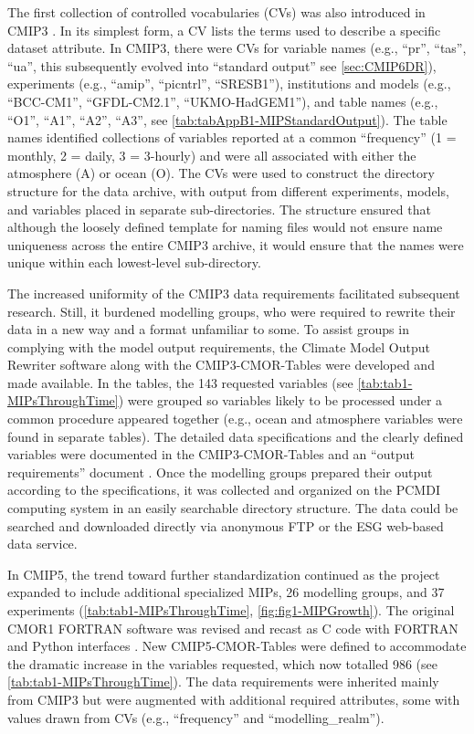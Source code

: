\documentclass[manuscript]{copernicus}
\begin{document}
The first collection of controlled vocabularies (CVs) was also introduced in CMIP3 \citep[e.g.,][]{taylor_pcmdi_2005}. In its simplest form, a CV lists the terms used to describe a specific dataset attribute. In CMIP3, there were CVs for variable names (e.g., ``pr'', ``tas'', ``ua'', this subsequently evolved into ``standard output'' see \autoref{sec:CMIP6DR}), experiments (e.g., ``amip'', ``picntrl'', ``SRESB1''), institutions and models (e.g., ``BCC-CM1'', ``GFDL-CM2.1'', ``UKMO-HadGEM1''), and table names (e.g., ``O1'', ``A1'', ``A2'', ``A3'', see \autoref{tab:tabAppB1-MIPStandardOutput}). The table names identified collections of variables reported at a common ``frequency'' (1 = monthly, 2 = daily, 3 = 3-hourly) and were all associated with either the atmosphere (A) or ocean (O). The CVs were used to construct the directory structure for the data archive, with output from different experiments, models, and variables placed in separate sub-directories. The structure ensured that although the loosely defined template for naming files would not ensure name uniqueness across the entire CMIP3 archive, it would ensure that the names were unique within each lowest-level sub-directory.

The increased uniformity of the CMIP3 data requirements facilitated subsequent research. Still, it burdened modelling groups, who were required to rewrite their data in a new way and a format unfamiliar to some. To assist groups in complying with the model output requirements, the Climate Model Output Rewriter software \citep[CMOR1;][]{taylor_cmor_2006} along with the CMIP3-CMOR-Tables \citep{doutriaux_cmip3_2005} were developed and made available. In the tables, the 143 requested variables (see \autoref{tab:tab1-MIPsThroughTime}) were grouped so variables likely to be processed under a common procedure appeared together (e.g., ocean and atmosphere variables were found in separate tables). The detailed data specifications and the clearly defined variables were documented in the CMIP3-CMOR-Tables and an ``output requirements'' document \citep{taylor_pcmdi_2005}. Once the modelling groups prepared their output according to the specifications, it was collected and organized on the PCMDI computing system in an easily searchable directory structure. The data could be searched and downloaded directly via anonymous FTP or the ESG web-based data service.

In CMIP5, the trend toward further standardization continued as the project expanded to include additional specialized MIPs, 26 modelling groups, and 37 experiments (\autoref{tab:tab1-MIPsThroughTime}, \autoref{fig:fig1-MIPGrowth}). The original CMOR1 FORTRAN software was revised and recast as C code with FORTRAN and Python interfaces \citep{doutriaux_cmor_2011}. New CMIP5-CMOR-Tables \citep{doutriaux_cmip5_2013} were defined to accommodate the dramatic increase in the variables requested, which now totalled 986 (see \autoref{tab:tab1-MIPsThroughTime}). The data requirements were inherited mainly from CMIP3 but were augmented with additional required attributes, some with values drawn from CVs (e.g., ``frequency'' and ``modelling\_realm'').
\end{document}

